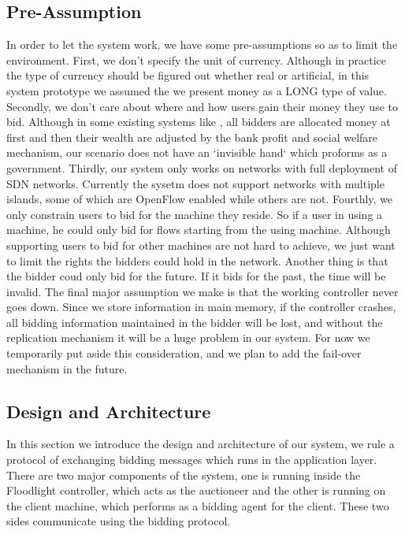 \documentclass[a4paper,11pt,twocolumn]{article}
\begin{document}
\subsection{Pre-Assumption}
In order to let the system work, we have some pre-assumptions so as to limit the environment. First, we don't specify the unit of 
currency. Although in practice the type of currency should be figured out whether real or artificial, in this system prototype we assumed
the we present money as a LONG type of value. Secondly, we don't care about where and how users gain their money they use to bid. Although in
some existing systems like \cite{ucsd}, all bidders are allocated money at first and then their wealth are adjusted by the bank profit and 
social welfare mechanism, our scenario does not have an `invisible hand` which proforms as a government. Thirdly, our system only works on 
networks with full deployment of SDN networks. Currently the sysetm does not support networks with multiple islands, some of which are 
OpenFlow enabled while others are not. Fourthly, we only constrain users to bid for the machine they reside. 
So if a user in using a machine, he could only bid for flows starting from the using machine. Although supporting
users to bid for other machines are not hard to achieve, we just want to limit the rights the bidders could hold in the network. Another thing 
is that the bidder coud only bid for the future. If it bids for the past, the time will be invalid.
The final major assumption we make is that the working controller never goes down. Since we store 
information in main memory, if the controller crashes, all bidding information maintained in the bidder will be lost, and without the 
replication mechanism it will be a huge problem in our system. For now we temporarily put aside this consideration, and we plan to add
the fail-over mechanism in the future. 



\subsection{Design and Architecture}
In this section we introduce the design and architecture of our system,
we rule a protocol of exchanging bidding messages which runs in the application layer. There are two major  components of the system,
one is running inside the Floodlight controller, which acts as the auctioneer and the other is running on the client machine, 
which performs as a bidding agent for the client. These two sides communicate using the bidding protocol. 
\end{document}
